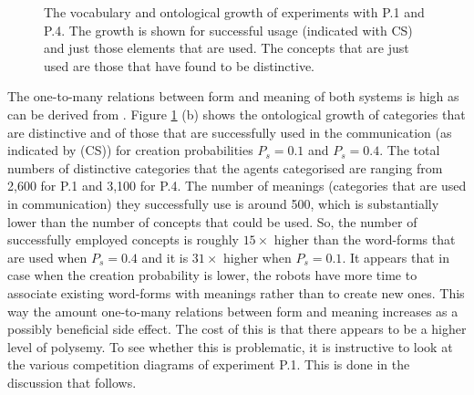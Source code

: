 \begin{figure}
\centering
{}
\caption{The vocabulary and ontological growth of experiments with P.1 and P.4. The growth is shown for successful usage (indicated with CS) and just those elements that are used. The concepts that are just used are those that have found to be distinctive.}
\label{f:opt:words}
\end{figure}

The one-to-many relations between form and meaning of both systems is high as can be derived from . Figure \ref{f:opt:words} (b) shows the ontological growth of categories that are distinctive and of those that are successfully used in the communication (as indicated by (CS)) for creation probabilities $P_s=0.1$ and $P_s=0.4$. The total numbers of distinctive categories that the agents categorised are ranging from 2,600 for P.1 and 3,100 for P.4. The number of meanings (categories that are used in communication) they successfully use is around 500, which is substantially lower than the number of concepts that could be used. So, the number of successfully employed concepts is roughly $15 \times$ higher than the word-forms that are used when $P_s=0.4$ and it is $31 \times$ higher when $P_s=0.1$. It appears that in case when the creation probability is lower, the robots have more time to associate existing word-forms with meanings rather than to create new ones. This way the amount one-to-many relations between form and meaning increases as a possibly beneficial side effect. The cost of this is that there appears to be a higher level of polysemy. To see whether this is problematic, it is instructive to look at the various competition diagrams of experiment P.1. This is done in the discussion that follows.


